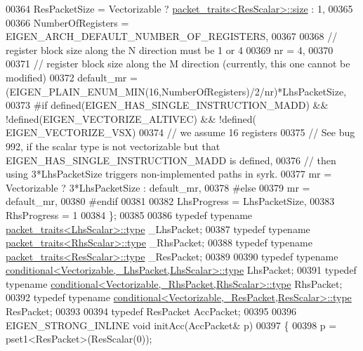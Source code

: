 \begin{DoxyCode}
00364     ResPacketSize = Vectorizable ? \hyperlink{struct_eigen_1_1internal_1_1packet__traits}{packet\_traits<ResScalar>::size} : 1,
00365     
00366     NumberOfRegisters = EIGEN\_ARCH\_DEFAULT\_NUMBER\_OF\_REGISTERS,
00367 
00368     \textcolor{comment}{// register block size along the N direction must be 1 or 4}
00369     nr = 4,
00370 
00371     \textcolor{comment}{// register block size along the M direction (currently, this one cannot be modified)}
00372     default\_mr = (EIGEN\_PLAIN\_ENUM\_MIN(16,NumberOfRegisters)/2/nr)*LhsPacketSize,
00373 #\textcolor{keywordflow}{if} defined(EIGEN\_HAS\_SINGLE\_INSTRUCTION\_MADD) && !defined(EIGEN\_VECTORIZE\_ALTIVEC) && !defined(
      EIGEN\_VECTORIZE\_VSX)
00374     \textcolor{comment}{// we assume 16 registers}
00375     \textcolor{comment}{// See bug 992, if the scalar type is not vectorizable but that EIGEN\_HAS\_SINGLE\_INSTRUCTION\_MADD is
       defined,}
00376     \textcolor{comment}{// then using 3*LhsPacketSize triggers non-implemented paths in syrk.}
00377     mr = Vectorizable ? 3*LhsPacketSize : default\_mr,
00378 \textcolor{preprocessor}{#else}
00379     mr = default\_mr,
00380 \textcolor{preprocessor}{#endif}
00381     
00382     LhsProgress = LhsPacketSize,
00383     RhsProgress = 1
00384   \};
00385 
00386   \textcolor{keyword}{typedef} \textcolor{keyword}{typename} \hyperlink{group___sparse_core___module}{packet\_traits<LhsScalar>::type}  \_LhsPacket;
00387   \textcolor{keyword}{typedef} \textcolor{keyword}{typename} \hyperlink{group___sparse_core___module}{packet\_traits<RhsScalar>::type}  \_RhsPacket;
00388   \textcolor{keyword}{typedef} \textcolor{keyword}{typename} \hyperlink{group___sparse_core___module}{packet\_traits<ResScalar>::type}  \_ResPacket;
00389 
00390   \textcolor{keyword}{typedef} \textcolor{keyword}{typename} \hyperlink{class_eigen_1_1internal_1_1_tensor_lazy_evaluator_writable}{conditional<Vectorizable,\_LhsPacket,LhsScalar>::type}
       LhsPacket;
00391   \textcolor{keyword}{typedef} \textcolor{keyword}{typename} \hyperlink{class_eigen_1_1internal_1_1_tensor_lazy_evaluator_writable}{conditional<Vectorizable,\_RhsPacket,RhsScalar>::type}
       RhsPacket;
00392   \textcolor{keyword}{typedef} \textcolor{keyword}{typename} \hyperlink{class_eigen_1_1internal_1_1_tensor_lazy_evaluator_writable}{conditional<Vectorizable,\_ResPacket,ResScalar>::type}
       ResPacket;
00393 
00394   \textcolor{keyword}{typedef} ResPacket AccPacket;
00395   
00396   EIGEN\_STRONG\_INLINE \textcolor{keywordtype}{void} initAcc(AccPacket& p)
00397   \{
00398     p = pset1<ResPacket>(ResScalar(0));

\end{DoxyCode}
